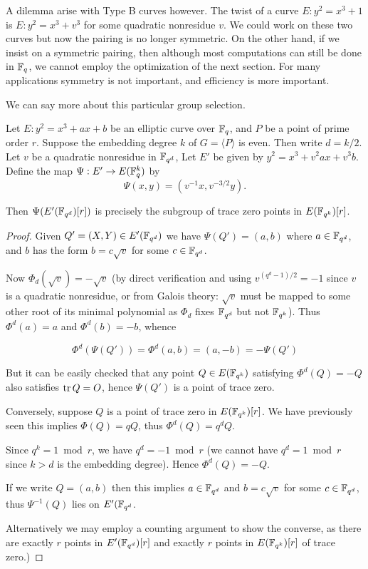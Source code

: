 A dilemma arise with Type B curves however. The twist
of a curve $E : y^2 = x^3 + 1 $ is $E: y^2 = x^3 + v^3 $ for some
quadratic nonresidue $v$. We could work on these two curves but now
the pairing is no longer symmetric. On the other hand, if we insist on
a symmetric pairing, then although most computations can still be done
in $\mathbb{F}_q$, we cannot employ the optimization of the next section. For
many applications symmetry is not important, and efficiency is more important.

We can say more about this particular group selection.

\begin{theorem}
Let $E : y^2 = x^3 + a x + b$ be an elliptic curve over $\mathbb{F}_q$,
and $P$ be a point of prime order $r$.
Suppose the embedding degree $k$ of $G = \langle P \rangle$ is even.
Then write $d = k / 2$. Let $v$ be a quadratic nonresidue in $\mathbb{F}_{q^d}$,
Let $E'$ be given by $y^2 = x^3 + v^2 a x + v^3 b$.
Define the map $\Psi:E'\rightarrow E(\mathbb{F}_q^k)$ by
\[ \Psi(x,y) = (v^{-1}x, v^{-3/2}y) . \]

Then $\Psi(E'(\mathbb{F}_{q^d})[r])$ is precisely the subgroup of trace zero points
in $E(\mathbb{F}_{q^k})[r]$.
\end{theorem}

\begin{proof}
Given $Q' = (X,Y) \in E'(\mathbb{F}_{q^d})$ we have $\Psi(Q') = (a, b)$
where $a \in \mathbb{F}_{q^d}$, and $b$ has the form $b = c \sqrt{v}$ for some
$c \in \mathbb{F}_{q^d}$.

Now $\Phi_d(\sqrt{v}) = -\sqrt{v}$ (by direct verification and using
$v^{(q^d - 1)/2} = -1$ since $v$ is a quadratic nonresidue, or
from Galois theory: $\sqrt{v}$ must
be mapped to some other root of its minimal polynomial as $\Phi_d$ fixes
$\mathbb{F}_{q^d}$ but not $\mathbb{F}_{q^k}$).
Thus $\Phi^d(a) = a$ and $\Phi^d(b) = -b$, whence

\[ \Phi^d(\Psi(Q')) = \Phi^d(a,b) = (a, -b) = -\Psi(Q') \]

But it can be easily checked that
any point $Q \in E(\mathbb{F}_{q^k})$ satisfying $\Phi^d(Q) = -Q$ also satisfies
$\mathop{\rm tr} Q = O$, hence $\Psi(Q')$ is a point of trace zero.

Conversely, suppose $Q$ is a point of trace zero in $E(\mathbb{F}_{q^k})[r]$.
We have previously seen this implies $\Phi(Q) = q Q$,
thus $\Phi^d(Q) = q^d Q$.

Since $q^k = 1 \bmod r$, we have $q^d = -1 \bmod r$ (we cannot
have $q^d = 1 \bmod r$ since $k > d$ is the embedding degree).
Hence $\Phi^d(Q) = -Q$.

If we write $Q=(a,b)$ then this implies $a \in \mathbb{F}_{q^d}$ and $b = c \sqrt{v}$
for some $c \in \mathbb{F}_{q^d}$, thus $\Psi^{-1}(Q)$ lies on $E'(\mathbb{F}_{q^d}$.

Alternatively we may employ a counting argument to show the converse,
as there are exactly
$r$ points in $E'(\mathbb{F}_{q^d})[r]$ and exactly $r$ points in $E(\mathbb{F}_{q^k})[r]$ of trace
zero.)
\end{proof}

